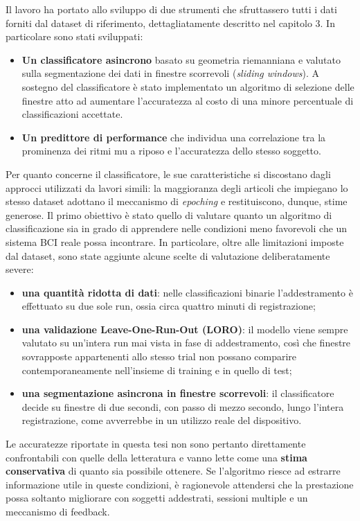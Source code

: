 Il lavoro ha portato allo sviluppo di due strumenti che sfruttassero tutti i dati forniti dal dataset di riferimento, dettagliatamente descritto nel capitolo 3. In particolare sono stati sviluppati:
\begin{itemize}
    \item \textbf{Un classificatore asincrono} basato su geometria riemanniana e valutato sulla segmentazione dei dati in finestre scorrevoli (\emph{sliding windows}). A sostegno del classificatore è stato implementato un algoritmo di selezione delle finestre atto ad aumentare l'accuratezza al costo di una minore percentuale di classificazioni accettate.
    \item \textbf{Un predittore di performance} che individua una correlazione tra la prominenza dei ritmi mu a riposo e l'accuratezza dello stesso soggetto.
\end{itemize}

Per quanto concerne il classificatore, le sue caratteristiche si discostano dagli approcci utilizzati da lavori simili: la maggioranza degli articoli che impiegano lo stesso dataset adottano il meccanismo di \emph{epoching} e restituiscono, dunque, stime generose. Il primo obiettivo è stato quello di valutare quanto un algoritmo di classificazione sia in grado di apprendere nelle condizioni meno favorevoli che un sistema BCI reale possa incontrare. In particolare, oltre alle limitazioni imposte dal dataset, sono state aggiunte alcune scelte di valutazione deliberatamente severe:
\begin{itemize}
    \item \textbf{una quantità ridotta di dati}: nelle classificazioni binarie l'addestramento è effettuato su due sole run, ossia circa quattro minuti di registrazione;
    \item \textbf{una validazione Leave-One-Run-Out (LORO)}: il modello viene sempre valutato su un'intera run mai vista in fase di addestramento, così che finestre sovrapposte appartenenti allo stesso trial non possano comparire contemporaneamente nell'insieme di training e in quello di test;
    \item \textbf{una segmentazione asincrona in finestre scorrevoli}: il classificatore decide su finestre di due secondi, con passo di mezzo secondo, lungo l'intera registrazione, come avverrebbe in un utilizzo reale del dispositivo.
\end{itemize}

Le accuratezze riportate in questa tesi non sono pertanto direttamente confrontabili con quelle della letteratura e vanno lette come una \textbf{stima conservativa} di quanto sia possibile ottenere. Se l'algoritmo riesce ad estrarre informazione utile in queste condizioni, è ragionevole attendersi che la prestazione possa soltanto migliorare con soggetti addestrati, sessioni multiple e un meccanismo di feedback.

